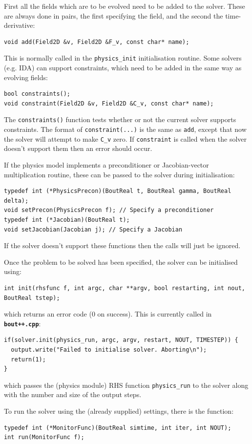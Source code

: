 \documentclass[12pt]{article}
\newcommand{\code}[1]{\texttt{#1}}
\newcommand{\file}[1]{\texttt{\bf #1}}
\begin{document}
First all the fields which are to be evolved need to be added
to the solver. These are always done in pairs, the first
specifying the field, and the second the time-derivative:
\begin{lstlisting}
void add(Field2D &v, Field2D &F_v, const char* name);
\end{lstlisting}
This is normally called in the \code{physics\_init} initialisation routine.
Some solvers (e.g. IDA) can support constraints, which need to be added
in the same way as evolving fields:
\begin{lstlisting}
bool constraints();
void constraint(Field2D &v, Field2D &C_v, const char* name);
\end{lstlisting}
The \code{constraints()} function tests whether or not the current
solver supports constraints. The format of \code{constraint(...)} is
the same as \code{add}, except that now the solver will attempt to make
\code{C\_v} zero. If \code{constraint} is called when the solver doesn't
support them then an error should occur.

If the physics model implements a preconditioner or Jacobian-vector
multiplication routine, these can be passed to the solver during
initialisation:
\begin{lstlisting}
typedef int (*PhysicsPrecon)(BoutReal t, BoutReal gamma, BoutReal delta);
void setPrecon(PhysicsPrecon f); // Specify a preconditioner
typedef int (*Jacobian)(BoutReal t);
void setJacobian(Jacobian j); // Specify a Jacobian
\end{lstlisting}
If the solver doesn't support these functions then the calls 
will just be ignored.

Once the problem to be solved has been specified, the solver can be
initialised using:
\begin{lstlisting}
int init(rhsfunc f, int argc, char **argv, bool restarting, int nout, BoutReal tstep);
\end{lstlisting}
which returns an error code (0 on success). This is currently
called in \file{bout++.cpp}:
\begin{lstlisting}
if(solver.init(physics_run, argc, argv, restart, NOUT, TIMESTEP)) {
  output.write("Failed to initialise solver. Aborting\n");
  return(1);
}
\end{lstlisting}
which passes the (physics module) RHS function \code{physics\_run}
to the solver along with the number and size of the output steps.

To run the solver using the (already supplied) settings, there is
the function:
\begin{lstlisting}
typedef int (*MonitorFunc)(BoutReal simtime, int iter, int NOUT);
int run(MonitorFunc f);
\end{lstlisting}
\end{document}
